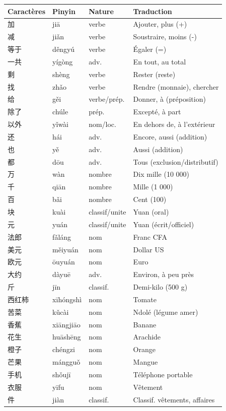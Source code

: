 \documentclass[11pt]{article}
\begin{document}
\begin{savaistu}
\begin{center}
\begin{tabularx}{\linewidth}{|X|X|X|X|}
\hline
\rowcolor{popblueL} \textbf{Caractères} & \textbf{Pinyin} & \textbf{Nature} & \textbf{Traduction} \\
\hline
加 & jiā & verbe & Ajouter, plus (+) \\
减 & jiǎn & verbe & Soustraire, moins (-) \\
等于 & děngyú & verbe & Égaler (=) \\
一共 & yígòng & adv. & En tout, au total \\
剩 & shèng & verbe & Rester (reste) \\
找 & zhǎo & verbe & Rendre (monnaie), chercher \\
给 & gěi & verbe/prép. & Donner, à (préposition) \\
除了 & chúle & prép. & Excepté, à part \\
以外 & yǐwài & nom/loc. & En dehors de, à l'extérieur \\
还 & hái & adv. & Encore, aussi (addition) \\
也 & yě & adv. & Aussi (addition) \\
都 & dōu & adv. & Tous (exclusion/distributif) \\
万 & wàn & nombre & Dix mille (10 000) \\
千 & qiān & nombre & Mille (1 000) \\
百 & bǎi & nombre & Cent (100) \\
块 & kuài & classif/unite & Yuan (oral) \\
元 & yuán & classif/unite & Yuan (écrit/officiel) \\
法郎 & fǎláng & nom & Franc CFA \\
美元 & měiyuán & nom & Dollar US \\
欧元 & ōuyuán & nom & Euro \\
大约 & dàyuē & adv. & Environ, à peu près \\
斤 & jīn & classif. & Demi-kilo (500 g) \\
西红柿 & xīhóngshì & nom & Tomate \\
苦菜 & kǔcài & nom & Ndolé (légume amer) \\
香蕉 & xiāngjiāo & nom & Banane \\
花生 & huāshēng & nom & Arachide \\
橙子 & chéngzi & nom & Orange \\
芒果 & mángguǒ & nom & Mangue \\
手机 & shǒujī & nom & Téléphone portable \\
衣服 & yīfu & nom & Vêtement \\
件 & jiàn & classif. & Classif. vêtements, affaires \\
\hline
\end{tabularx}
\end{center}
\end{savaistu}
\end{document}
